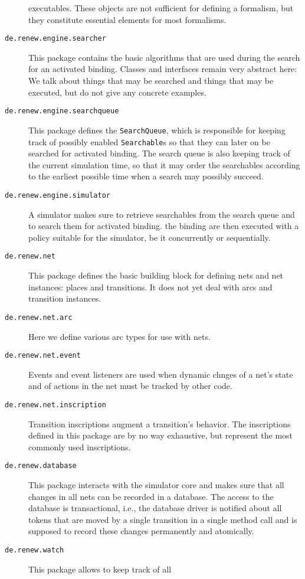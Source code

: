 \begin{description}
  executables. These objects are not sufficient for
  defining a formalism, but they constitute essential
  elements for most formalisms.
\item[\texttt{de.renew.engine.searcher}] 
  This package contains the basic algorithms that are
  used during the search for an activated binding.
  Classes and interfaces remain very abstract here:
  We talk about things that may be searched and things
  that may be executed, but do not give any concrete
  examples.
\item[\texttt{de.renew.engine.searchqueue}] 
  This package defines the \texttt{SearchQueue}, which is responsible
  for keeping track of possibly enabled \texttt{Searchable}s so
  that they can later on be searched for activated binding.
  The search queue is also keeping track of the current simulation
  time, so that it may order the searchables according to the earliest
  possible time when a search may possibly succeed.
\item[\texttt{de.renew.engine.simulator}] 
  A simulator makes sure to retrieve searchables from the
  search queue and to search them for activated binding.
  the binding are then executed with a policy suitable for
  the simulator, be it concurrently or sequentially.
\item[\texttt{de.renew.net}] 
  This package defines the basic building block for defining nets
  and net instances: places and transitions. It does not yet deal
  with arcs and transition instances.
\item[\texttt{de.renew.net.arc}] 
  Here we define various arc types for use with nets.
\item[\texttt{de.renew.net.event}] 
  Events and event listeners are used when dynamic chnges of
  a net's state and of actions in the net must be tracked
  by other code.
\item[\texttt{de.renew.net.inscription}] 
  Transition inscriptions augment a transition's behavior.
  The inscriptions defined in this package are by no way
  exhaustive, but represent the most commonly used inscriptions.
\item[\texttt{de.renew.database}] This package interacts with the
  simulator core and makes sure that all changes in all nets
  can be recorded in a database. The access to the database is
  transactional, i.e., the database driver is notified about all
  tokens that are moved by a single transition in a single
  method call and is supposed to record these changes permanently
  and atomically.
\item[\texttt{de.renew.watch}] This package allows to keep track of all

\end{description}
